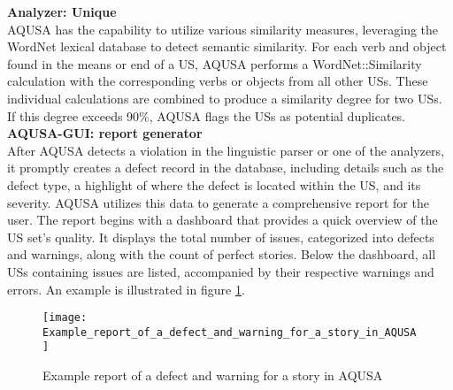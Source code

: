 \textbf{Analyzer: Unique}\\ 
AQUSA has the capability to utilize various similarity measures, leveraging the WordNet lexical database to detect semantic similarity. For each verb and object found in the means or end of a US, AQUSA performs a WordNet::Similarity calculation with the corresponding verbs or objects from all other USs. These individual calculations are combined to produce a similarity degree for two USs. If this degree exceeds 90\%, AQUSA flags the USs as potential duplicates. \\ 
\textbf{AQUSA-GUI: report generator}\\ 
After AQUSA detects a violation in the linguistic parser or one of the analyzers, it promptly creates a defect record in the database, including details such as the defect type, a highlight of where the defect is located within the US, and its severity. AQUSA utilizes this data to generate a comprehensive report for the user.
The report begins with a dashboard that provides a quick overview of the US set's quality. It displays the total number of issues, categorized into defects and warnings, along with the count of perfect stories. Below the dashboard, all USs containing issues are listed, accompanied by their respective warnings and errors. An example is illustrated in figure \ref{fig:aqusa_report}.
\begin{figure}
\center
\texttt{[image: Example\_report\_of\_a\_defect\_and\_warning\_for\_a\_story\_in\_AQUSA]}
\caption{Example report of a defect and warning for a story in AQUSA \cite{lucassen2016improving}}\label{fig:aqusa_report}
\end{figure}

















